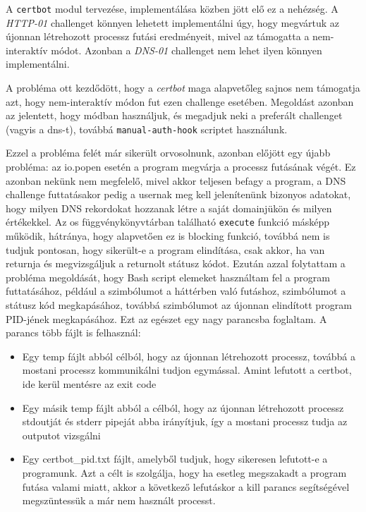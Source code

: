 A \texttt{certbot} modul tervezése, implementálása közben jött elő ez a nehézség. A \textit{HTTP-01} challenget könnyen lehetett implementálni úgy, hogy megvártuk az újonnan létrehozott processz futási eredményeit, mivel az támogatta a nem-interaktív módot. Azonban a \textit{DNS-01} challenget nem lehet ilyen könnyen implementálni.

A probléma ott kezdődött, hogy a \textit{certbot} maga alapvetőleg sajnos nem támogatja azt, hogy nem-interaktív módon fut ezen challenge esetében. Megoldást azonban az jelentett, hogy \texttt{} módban használjuk, és megadjuk neki a preferált challenget (vagyis a dns-t), továbbá \texttt{manual-auth-hook} scriptet használunk. 


Ezzel a probléma felét már sikerült orvosolnunk, azonban előjött egy újabb probléma: az io.popen esetén a program megvárja a processz futásának végét. Ez azonban nekünk nem megfelelő, mivel akkor teljesen befagy a program, a DNS challenge futtatásakor pedig a usernak meg kell jelenítenünk bizonyos adatokat, hogy milyen DNS rekordokat hozzanak létre a saját domainjükön és milyen értékekkel. Az os függvénykönyvtárban található \texttt{execute} funkció másképp működik, hátránya, hogy alapvetően ez is blocking funkció, továbbá nem is tudjuk pontosan, hogy sikerült-e a program elindítása, csak akkor, ha van returnja és megvizsgáljuk a returnolt státusz kódot.
Ezután azzal folytattam a probléma megoldását, hogy Bash script elemeket használtam fel a program futtatásához, például a \texttt{\detokenize{&}} szimbólumot a háttérben való futáshoz, \texttt{} szimbólumot a státusz kód megkapásához, továbbá \texttt{\detokenize{$!}} szimbólumot az újonnan elindított program PID-jének megkapásához. Ezt az egészet egy nagy parancsba foglaltam. A parancs több fájlt is felhasznál:
\begin{itemize}
    \item Egy temp fájlt abból célból, hogy az újonnan létrehozott processz, továbbá a mostani processz kommunikálni tudjon egymással. Amint lefutott a certbot, ide kerül mentésre az exit code
    \item Egy másik temp fájlt abból a célból, hogy az újonnan létrehozott processz stdoutját és stderr pipeját abba irányítjuk, így a mostani processz tudja az outputot vizsgálni
    \item Egy certbot\_pid.txt fájlt, amelyből tudjuk, hogy sikeresen lefutott-e a programunk. Azt a célt is szolgálja, hogy ha esetleg megszakadt a program futása valami miatt, akkor a következő lefutáskor a kill parancs segítségével megszüntessük a már nem használt processt.
\end{itemize}

